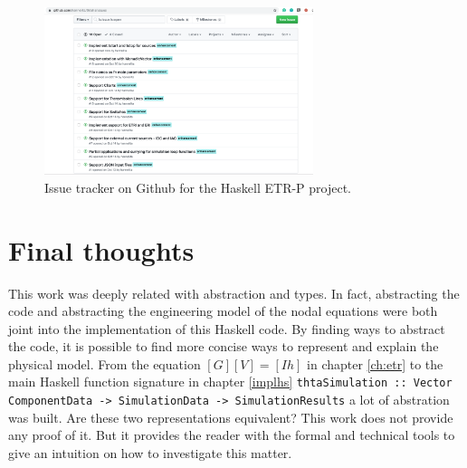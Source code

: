 \begin{figure}[H]
   \centering
   \includegraphics[width=0.7\textwidth]{img/featuresgithub.png}
   \caption{Issue tracker on Github for the Haskell ETR-P project.}
   \label{fig:featuresgithub}
\end{figure}

\section{Final thoughts}

This work was deeply related with abstraction and types. In fact, abstracting the code and abstracting the engineering model of the nodal equations were both joint into the implementation of this Haskell code. By finding ways to abstract the code, it is possible to find more concise ways to represent and explain the physical model. From the equation $[G][V] = [Ih]$ in chapter \ref{ch:etr} to the main Haskell function signature in chapter \ref{implhs} \lstinline!thtaSimulation :: Vector ComponentData -> SimulationData -> SimulationResults! a lot of abstration was built. Are these two representations equivalent? This work does not provide any proof of it. But it provides the reader with the formal and technical tools to give an intuition on how to investigate this matter. 



